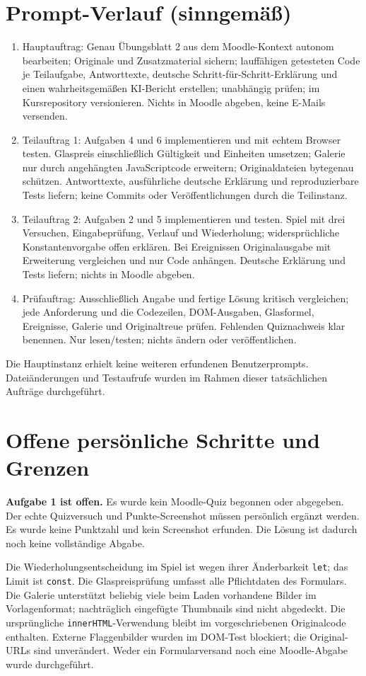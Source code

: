 \documentclass[11pt,a4paper]{article}
\begin{document}
\section*{Prompt-Verlauf (sinngemäß)}
\begin{enumerate}
\item Hauptauftrag: Genau Übungsblatt 2 aus dem Moodle-Kontext autonom bearbeiten; Originale und Zusatzmaterial sichern; lauffähigen getesteten Code je Teilaufgabe, Antworttexte, deutsche Schritt-für-Schritt-Erklärung und einen wahrheitsgemäßen KI-Bericht erstellen; unabhängig prüfen; im Kursrepository versionieren. Nichts in Moodle abgeben, keine E-Mails versenden.
\item Teilauftrag 1: Aufgaben 4 und 6 implementieren und mit echtem Browser testen. Glaspreis einschließlich Gültigkeit und Einheiten umsetzen; Galerie nur durch angehängten JavaScriptcode erweitern; Originaldateien bytegenau schützen. Antworttexte, ausführliche deutsche Erklärung und reproduzierbare Tests liefern; keine Commits oder Veröffentlichungen durch die Teilinstanz.
\item Teilauftrag 2: Aufgaben 2 und 5 implementieren und testen. Spiel mit drei Versuchen, Eingabeprüfung, Verlauf und Wiederholung; widersprüchliche Konstantenvorgabe offen erklären. Bei Ereignissen Originalausgabe mit Erweiterung vergleichen und nur Code anhängen. Deutsche Erklärung und Tests liefern; nichts in Moodle abgeben.
\item Prüfauftrag: Ausschließlich Angabe und fertige Lösung kritisch vergleichen; jede Anforderung und die Codezeilen, DOM-Ausgaben, Glasformel, Ereignisse, Galerie und Originaltreue prüfen. Fehlenden Quiznachweis klar benennen. Nur lesen/testen; nichts ändern oder veröffentlichen.
\end{enumerate}
Die Hauptinstanz erhielt keine weiteren erfundenen Benutzerprompts. Dateiänderungen und Testaufrufe wurden im Rahmen dieser tatsächlichen Aufträge durchgeführt.

\section*{Offene persönliche Schritte und Grenzen}
\textbf{Aufgabe 1 ist offen.} Es wurde kein Moodle-Quiz begonnen oder abgegeben. Der echte Quizversuch und Punkte-Screenshot müssen persönlich ergänzt werden. Es wurde keine Punktzahl und kein Screenshot erfunden. Die Lösung ist dadurch noch keine vollständige Abgabe.

Die Wiederholungsentscheidung im Spiel ist wegen ihrer Änderbarkeit \texttt{let}; das Limit ist \texttt{const}. Die Glaspreisprüfung umfasst alle Pflichtdaten des Formulars. Die Galerie unterstützt beliebig viele beim Laden vorhandene Bilder im Vorlagenformat; nachträglich eingefügte Thumbnails sind nicht abgedeckt. Die ursprüngliche \texttt{innerHTML}-Verwendung bleibt im vorgeschriebenen Originalcode enthalten. Externe Flaggenbilder wurden im DOM-Test blockiert; die Original-URLs sind unverändert. Weder ein Formularversand noch eine Moodle-Abgabe wurde durchgeführt.
\end{document}
